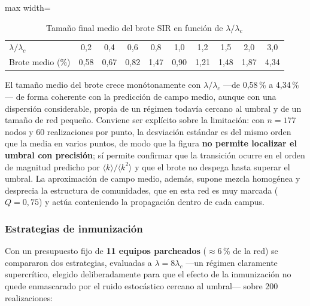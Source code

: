 \documentclass[10pt,a4paper]{extarticle}
\begin{document}
\begin{table}[H]
\centering
\caption{Tamaño final medio del brote SIR en función de $\lambda/\lambda_c$}
\label{tab:sir}
\small
\begin{adjustbox}{max width=\textwidth}
\begin{tabular}{lccccccccc}
\toprule
$\lambda/\lambda_c$ & 0,2 & 0,4 & 0,6 & 0,8 & 1,0 & 1,2 & 1,5 & 2,0 & 3,0 \\
Brote medio (\%)    & 0,58 & 0,67 & 0,82 & 1,47 & 0,90 & 1,21 & 1,48 & 1,87 & 4,34 \\
\bottomrule
\end{tabular}
\end{adjustbox}
\end{table}

El tamaño medio del brote crece monótonamente con $\lambda/\lambda_c$ ---de 0,58\,\% a
4,34\,\%--- de forma coherente con la predicción de campo medio, aunque con una dispersión
considerable, propia de un régimen todavía cercano al umbral y de un tamaño de red pequeño.
Conviene ser explícito sobre la limitación: con $n = 177$ nodos y 60 realizaciones por
punto, la desviación estándar es del mismo orden que la media en varios puntos, de modo que
la figura \textbf{no permite localizar el umbral con precisión}; sí permite confirmar que la
transición ocurre en el orden de magnitud predicho por $\langle k\rangle/\langle k^2\rangle$
y que el brote no despega hasta superar el umbral. La aproximación de campo medio, además,
supone mezcla homogénea y desprecia la estructura de comunidades, que en esta red es muy
marcada ($Q = 0{,}75$) y actúa conteniendo la propagación dentro de cada campus.

\subsubsection{Estrategias de inmunización}

Con un presupuesto fijo de \textbf{11 equipos parcheados} ($\approx 6$\,\% de la red) se
compararon dos estrategias, evaluadas a $\lambda = 8\lambda_c$ ---un régimen claramente
supercrítico, elegido deliberadamente para que el efecto de la inmunización no quede
enmascarado por el ruido estocástico cercano al umbral--- sobre 200 realizaciones:
\end{document}
